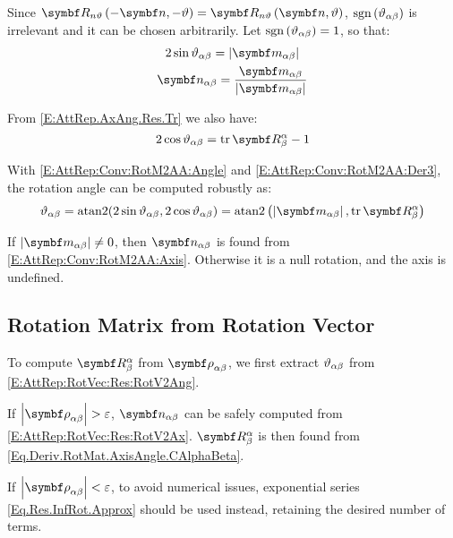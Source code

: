 Since $\RotMAxAng{-\mcol{\rotax}}{-\rotang} = \RotMAxAng{\mcol{\rotax}}{\rotang}$, $\operatorname{sgn} \left({\vartheta_{\alpha \beta}}\right)$ is irrelevant and it can be chosen arbitrarily. Let $\operatorname{sgn} \left({\vartheta_{\alpha \beta}}\right) = 1$, so that:
\begin{subequations}
\begin{gather}
	2 \sin \rel{\rotang}{\alpha}{\beta} = \norm{\vrel{m}{\alpha}{\beta}} \label{E:AttRep:Conv:RotM2AA:Angle}\\
	\vrel{\rotax}{\alpha}{\beta} = \frac{\vrel{m}{\alpha}{\beta}}{\norm{\vrel{m}{\alpha}{\beta}}} \label{E:AttRep:Conv:RotM2AA:Axis}
\end{gather}
\end{subequations}

From \eqref{E:AttRep.AxAng.Res.Tr} we also have:
\begin{equation} \label{E:AttRep:Conv:RotM2AA:Der3}	
	2 \cos \rel{\rotang}{\alpha}{\beta} = \trace{\RotM{\alpha}{\beta}} - 1
\end{equation}

With \eqref{E:AttRep:Conv:RotM2AA:Angle} and \eqref{E:AttRep:Conv:RotM2AA:Der3}, the rotation angle can be computed robustly as:
\begin{equation} \label{E:AttRep:Conv:RotM2AA:AngleFinal}
	\rel{\rotang}{\alpha}{\beta} = \atan2( 2 \sin \rel{\rotang}{\alpha}{\beta}, 2 \cos \rel{\rotang}{\alpha}{\beta} ) = \atan2 \left( \norm{\vrel{m}{\alpha}{\beta}}, \trace{\RotM{\alpha}{\beta}} \right)
\end{equation} 

If $\norm{\vrel{m}{\alpha}{\beta}} \neq 0$, then $\vrel{\rotax}{\alpha}{\beta}$ is found from \eqref{E:AttRep:Conv:RotM2AA:Axis}. Otherwise it is a null rotation, and the axis is undefined.

\subsection{Rotation Matrix from Rotation Vector}
To compute $\RotM{\alpha}{\beta}$ from $\rotv[]{\alpha}{\beta}$, we first extract $\vartheta_{\alpha \beta}$ from \eqref{E:AttRep:RotVec:Res:RotV2Ang}.

If $\norm{\rotv[]{\alpha}{\beta}} > \varepsilon$, $\vrel{\rotax}{\alpha}{\beta}$ can be safely computed from \eqref{E:AttRep:RotVec:Res:RotV2Ax}. $\RotM{\alpha}{\beta}$ is then found from \eqref{Eq.Deriv.RotMat.AxisAngle.CAlphaBeta}.

If $\norm{\rotv[]{\alpha}{\beta}} < \varepsilon$, to avoid numerical issues, exponential series \eqref{Eq.Res.InfRot.Approx} should be used instead, retaining the desired number of terms.

